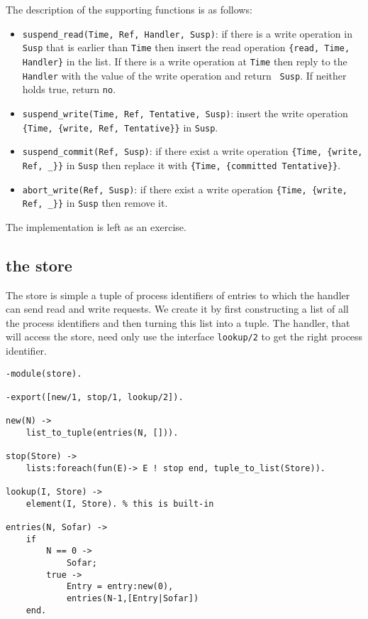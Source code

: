\documentclass[a4paper, 11pt]{article}
\begin{document}
The description of the supporting functions is as follows:

\begin{itemize} 

\item {\tt suspend\_read(Time, Ref, Handler, Susp)}: if there is a
  write operation in {\tt Susp} that is earlier than {\tt Time} then
  insert the read operation {\tt \{read, Time, Handler\}} in the
  list. If there is a write operation at {\tt Time} then reply to the
  {\tt Handler} with the value of the write operation and return {\tt
    Susp}. If neither holds true, return {\tt no}.

\item {\tt suspend\_write(Time, Ref, Tentative, Susp)}: insert the 
write operation {\tt \{Time, \{write, Ref, Tentative\}\}} in {\tt Susp}.

\item {\tt suspend\_commit(Ref, Susp)}: if there exist a write
  operation {\tt \{Time, \{write, Ref, \_\}\}} in {\tt Susp} then
  replace it with {\tt \{Time, \{committed Tentative\}\}}.

\item {\tt abort\_write(Ref, Susp)}: if there exist a write
  operation {\tt \{Time, \{write, Ref, \_\}\}} in {\tt Susp} then
  remove it. 
\end{itemize}


The implementation is left as an exercise.

\subsection{the store}

The store is simple a tuple of process identifiers of entries to
which the handler can send read and write requests. We create it by
first constructing a list of all the process identifiers and then
turning this list into a tuple. The handler, that will access the
store, need only use the interface {\tt lookup/2} to get the right
process identifier.

\begin{verbatim}
-module(store).

-export([new/1, stop/1, lookup/2]).

new(N) ->
    list_to_tuple(entries(N, [])).

stop(Store) ->
    lists:foreach(fun(E)-> E ! stop end, tuple_to_list(Store)).

lookup(I, Store) ->
    element(I, Store). % this is built-in

entries(N, Sofar) ->
    if 
        N == 0 ->
            Sofar;
        true ->
            Entry = entry:new(0),
            entries(N-1,[Entry|Sofar])
    end.
\end{verbatim}
\end{document}
